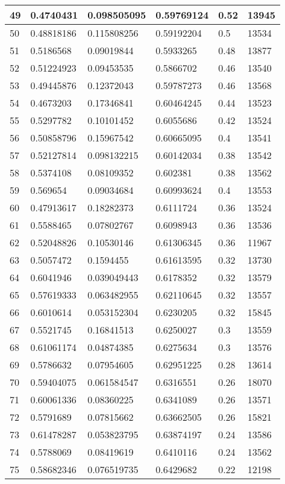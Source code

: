 \begin{longtable}{|l|l|l|l|l|l|}
49 & 0.4740431 & 0.098505095 & 0.59769124 & 0.52 & 13945 \\ \hline 
50 & 0.48818186 & 0.115808256 & 0.59192204 & 0.5 & 13534 \\ \hline 
51 & 0.5186568 & 0.09019844 & 0.5933265 & 0.48 & 13877 \\ \hline 
52 & 0.51224923 & 0.09453535 & 0.5866702 & 0.46 & 13540 \\ \hline 
53 & 0.49445876 & 0.12372043 & 0.59787273 & 0.46 & 13568 \\ \hline 
54 & 0.4673203 & 0.17346841 & 0.60464245 & 0.44 & 13523 \\ \hline 
55 & 0.5297782 & 0.10101452 & 0.6055686 & 0.42 & 13524 \\ \hline 
56 & 0.50858796 & 0.15967542 & 0.60665095 & 0.4 & 13541 \\ \hline 
57 & 0.52127814 & 0.098132215 & 0.60142034 & 0.38 & 13542 \\ \hline 
58 & 0.5374108 & 0.08109352 & 0.602381 & 0.38 & 13562 \\ \hline 
59 & 0.569654 & 0.09034684 & 0.60993624 & 0.4 & 13553 \\ \hline 
60 & 0.47913617 & 0.18282373 & 0.6111724 & 0.36 & 13524 \\ \hline 
61 & 0.5588465 & 0.07802767 & 0.6098943 & 0.36 & 13536 \\ \hline 
62 & 0.52048826 & 0.10530146 & 0.61306345 & 0.36 & 11967 \\ \hline 
63 & 0.5057472 & 0.1594455 & 0.61613595 & 0.32 & 13730 \\ \hline 
64 & 0.6041946 & 0.039049443 & 0.6178352 & 0.32 & 13579 \\ \hline 
65 & 0.57619333 & 0.063482955 & 0.62110645 & 0.32 & 13557 \\ \hline 
66 & 0.6010614 & 0.053152304 & 0.6230205 & 0.32 & 15845 \\ \hline 
67 & 0.5521745 & 0.16841513 & 0.6250027 & 0.3 & 13559 \\ \hline 
68 & 0.61061174 & 0.04874385 & 0.6275634 & 0.3 & 13576 \\ \hline 
69 & 0.5786632 & 0.07954605 & 0.62951225 & 0.28 & 13614 \\ \hline 
70 & 0.59404075 & 0.061584547 & 0.6316551 & 0.26 & 18070 \\ \hline 
71 & 0.60061336 & 0.08360225 & 0.6341089 & 0.26 & 13571 \\ \hline 
72 & 0.5791689 & 0.07815662 & 0.63662505 & 0.26 & 15821 \\ \hline 
73 & 0.61478287 & 0.053823795 & 0.63874197 & 0.24 & 13586 \\ \hline 
74 & 0.5788069 & 0.08419619 & 0.6410116 & 0.24 & 13562 \\ \hline 
75 & 0.58682346 & 0.076519735 & 0.6429682 & 0.22 & 12198 \\ \hline 
\end{longtable}